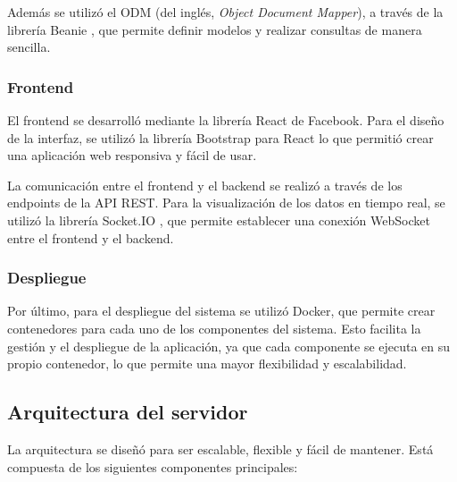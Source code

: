 Además se utilizó el ODM (del inglés, \textit{Object Document Mapper}), a
través de la librería Beanie \cite{BeaniODM}, que permite definir modelos y
realizar consultas de manera sencilla.

\subsubsection{Frontend}

El frontend se desarrolló mediante la librería React de Facebook. Para el
diseño de la interfaz, se utilizó la librería Bootstrap para React
\cite{ReactBootstrap} lo que permitió crear una aplicación web responsiva y
fácil de usar.

La comunicación entre el frontend y el backend se realizó a través de los
endpoints de la API REST. Para la visualización de los datos en tiempo real, se
utilizó la librería Socket.IO \cite{SocketIO}, que permite establecer una
conexión WebSocket entre el frontend y el backend.

\subsubsection{Despliegue}

Por último, para el despliegue del sistema se utilizó Docker, que permite crear
contenedores para cada uno de los componentes del sistema. Esto facilita la
gestión y el despliegue de la aplicación, ya que cada componente se ejecuta en
su propio contenedor, lo que permite una mayor flexibilidad y escalabilidad.


\subsection{Arquitectura del servidor}

La arquitectura se diseñó para ser escalable, flexible y fácil de mantener.
Está compuesta de los siguientes componentes principales:


